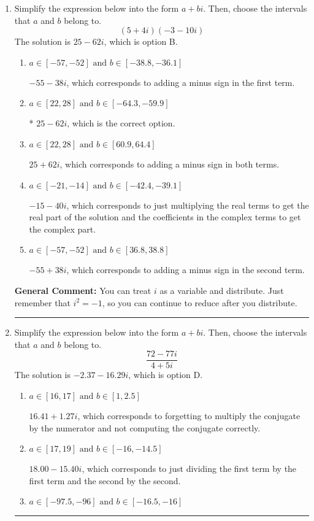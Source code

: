 \documentclass{extbook}[14pt]
\newcommand{\litem}[1]{\item #1

\rule{\textwidth}{0.4pt}}
\begin{document}
\begin{enumerate}\litem{
Simplify the expression below into the form $a+bi$. Then, choose the intervals that $a$ and $b$ belong to.
\[ (5 + 4 i)(-3 - 10 i) \]The solution is \( 25 - 62 i \), which is option B.\begin{enumerate}[label=\Alph*.]
\item \( a \in [-57, -52] \text{ and } b \in [-38.8, -36.1] \)

 $-55 - 38 i$, which corresponds to adding a minus sign in the first term.
\item \( a \in [22, 28] \text{ and } b \in [-64.3, -59.9] \)

* $25 - 62 i$, which is the correct option.
\item \( a \in [22, 28] \text{ and } b \in [60.9, 64.4] \)

 $25 + 62 i$, which corresponds to adding a minus sign in both terms.
\item \( a \in [-21, -14] \text{ and } b \in [-42.4, -39.1] \)

 $-15 - 40 i$, which corresponds to just multiplying the real terms to get the real part of the solution and the coefficients in the complex terms to get the complex part.
\item \( a \in [-57, -52] \text{ and } b \in [36.8, 38.8] \)

 $-55 + 38 i$, which corresponds to adding a minus sign in the second term.
\end{enumerate}

\textbf{General Comment:} You can treat $i$ as a variable and distribute. Just remember that $i^2=-1$, so you can continue to reduce after you distribute.
}
\litem{
Simplify the expression below into the form $a+bi$. Then, choose the intervals that $a$ and $b$ belong to.
\[ \frac{72 - 77 i}{4 + 5 i} \]The solution is \( -2.37  - 16.29 i \), which is option D.\begin{enumerate}[label=\Alph*.]
\item \( a \in [16, 17] \text{ and } b \in [1, 2.5] \)

 $16.41  + 1.27 i$, which corresponds to forgetting to multiply the conjugate by the numerator and not computing the conjugate correctly.
\item \( a \in [17, 19] \text{ and } b \in [-16, -14.5] \)

 $18.00  - 15.40 i$, which corresponds to just dividing the first term by the first term and the second by the second.
\item \( a \in [-97.5, -96] \text{ and } b \in [-16.5, -16] \)


\end{enumerate}}
\end{enumerate}
\end{document}
